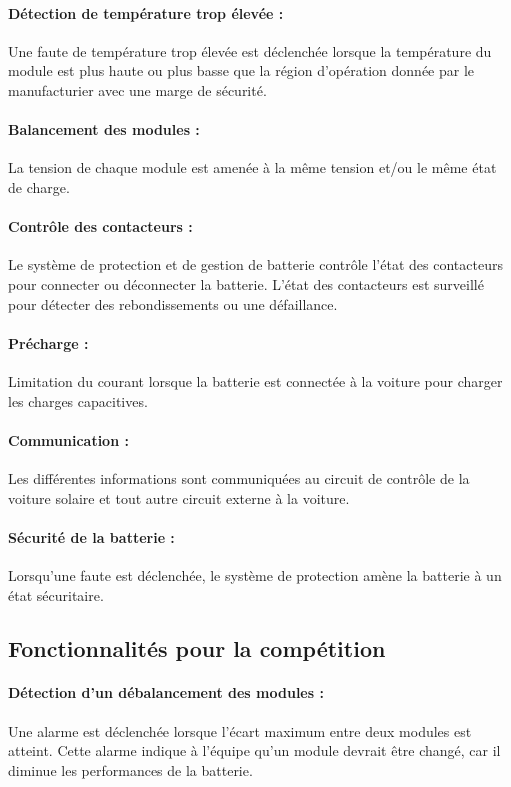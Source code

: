 		\paragraph{Détection de température trop élevée :}	
		Une faute de température trop élevée est déclenchée lorsque la température du module est plus haute ou plus basse que la région d'opération donnée par le manufacturier avec une marge de sécurité.
		
		\paragraph{Balancement des modules :}	
		La tension de chaque module est amenée à la même tension et/ou le même état de charge.
		
		\paragraph{Contrôle des contacteurs :}	
		Le système de protection et de gestion de batterie contrôle l'état des contacteurs pour connecter ou déconnecter la batterie. L'état des contacteurs est surveillé pour détecter des rebondissements ou une défaillance.
		
		\paragraph{Précharge :}	
		Limitation du courant lorsque la batterie est connectée à la voiture pour charger les charges capacitives.
		
		\paragraph{Communication :}	
		Les différentes informations sont communiquées au circuit de contrôle de la voiture solaire et tout autre circuit externe à la voiture.
		
		\paragraph{Sécurité de la batterie :}	
		Lorsqu'une faute est déclenchée, le système de protection amène la batterie à un état sécuritaire. 
	
	\subsection{Fonctionnalités pour la compétition}
	
		\paragraph{Détection d'un débalancement des modules :}	
		Une alarme est déclenchée lorsque l'écart maximum entre deux modules est atteint. Cette alarme indique à l'équipe qu'un module devrait être changé, car il diminue les performances de la batterie.  
		
